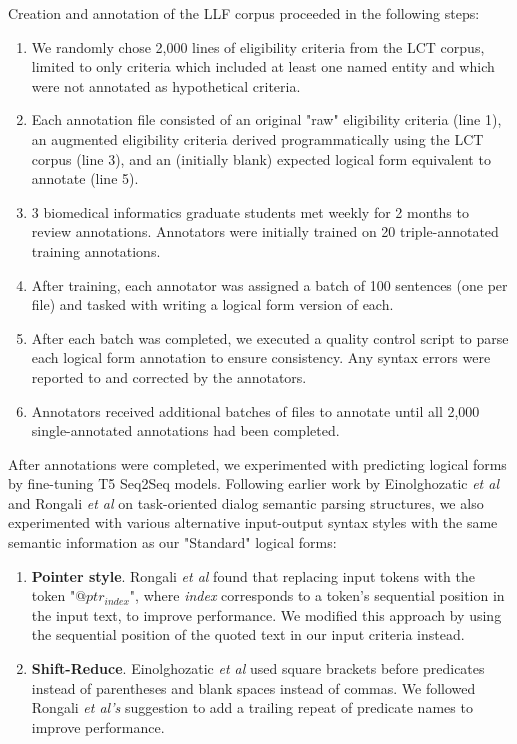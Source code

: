\documentclass[../main.tex]{subfiles}
\begin{document}
Creation and annotation of the LLF corpus proceeded in the following steps:

\begin{enumerate}
    \item We randomly chose 2,000 lines of eligibility criteria from the LCT corpus, limited to only criteria which included at least one named entity and which were not annotated as hypothetical criteria.
    \item  Each annotation file consisted of an original "raw" eligibility criteria (line 1), an augmented eligibility criteria derived programmatically using the LCT corpus (line 3), and an (initially blank) expected logical form equivalent to annotate (line 5).
    \item 3 biomedical informatics graduate students met weekly for 2 months to review annotations. Annotators were initially trained on 20 triple-annotated training annotations. 
    \item After training, each annotator was assigned a batch of 100 sentences (one per file) and tasked with writing a logical form version of each.
    \item After each batch was completed, we executed a quality control script to parse each logical form annotation to ensure consistency. Any syntax errors were reported to and corrected by the annotators.
    \item Annotators received additional batches of files to annotate until all 2,000 single-annotated annotations had been completed.
\end{enumerate}

After annotations were completed, we experimented with predicting logical forms by fine-tuning T5 \cite{raffel2020exploring} Seq2Seq models. Following earlier work by Einolghozatic \textit{et al} \cite{einolghozati2019improving} and Rongali \textit{et al} \cite{rongali2020don} on task-oriented dialog semantic parsing structures, we also experimented with various alternative input-output syntax styles with the same semantic information as our "Standard" logical forms:

\begin{enumerate}
    \item \textbf{Pointer style}. Rongali \textit{et al} found that replacing input tokens with the token "$@ptr_{index}$", where \textit{index} corresponds to a token's sequential position in the input text, to improve performance. We modified this approach by using the sequential position of the quoted text in our input criteria instead.
    \item \textbf{Shift-Reduce}. Einolghozatic \textit{et al} \cite{einolghozati2019improving} used square brackets before predicates instead of parentheses and blank spaces instead of commas. We followed Rongali \textit{et al's} suggestion to add a trailing repeat of predicate names to improve performance.
\end{enumerate}
\end{document}
